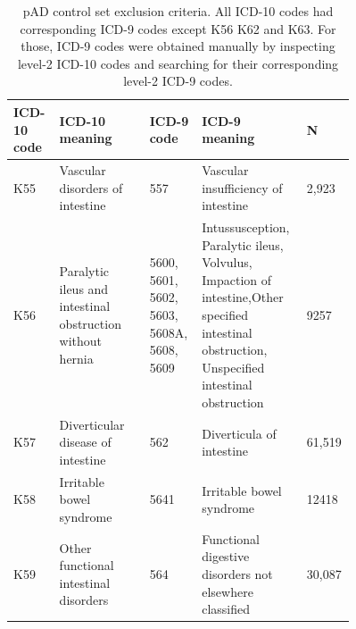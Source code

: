 \begin{table}[H]
  \caption[UKBB pAD control exclusion criteria]{pAD control set exclusion criteria. All ICD-10 codes had corresponding ICD-9 codes except K56 K62 and K63. For those, ICD-9 codes were obtained manually by inspecting level-2 ICD-10 codes and searching for their corresponding level-2 ICD-9 codes.}
  \label{table:ukbb_ctrl_excl_criteria}
  \fontsize{10}{11}\selectfont

  \begin{tabular}{|p{0.1\linewidth}|p{0.25\linewidth}|p{0.1\linewidth}|p{0.25\linewidth}|p{0.06\linewidth}|}
  \hline
  \textbf{ICD-10 code} & \textbf{ICD-10
   meaning}                                            & \textbf{ICD-9 code}                          & \textbf{ICD-9 meaning}     & \textbf{N}                                                                                                                                                          \\ \hline
  K55         & Vascular disorders of intestine                           & 557                                 & Vascular insufficiency of intestine       & 2,923                                                                                                                                  \\ \hline
  K56         & Paralytic ileus and intestinal obstruction without hernia & 5600, 5601, 5602, 5603, 5608A, 5608, 5609 & Intussusception, Paralytic ileus, Volvulus, Impaction of intestine,Other specified intestinal obstruction, Unspecified intestinal obstruction & 9257                              \\ \hline
  K57         & Diverticular disease of intestine                         & 562                                 & Diverticula of intestine              &     61,519                                                                                                                                  \\ \hline
  K58         & Irritable bowel syndrome                                  & 5641                                & Irritable bowel syndrome          & 12418                                                                                                                                          \\ \hline
  K59         & Other functional intestinal disorders                     & 564                                 & Functional digestive disorders not elsewhere classified      & 30,087                                                                                                               \\ \hline

\end{tabular}
\end{table}

